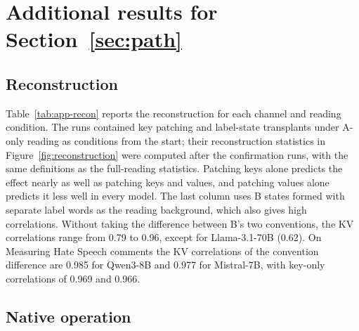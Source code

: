 \section{Additional results for Section~\ref{sec:path}}

\subsection{Reconstruction}
\label{app:reconstruction}

Table~\ref{tab:app-recon} reports the reconstruction for each channel and reading condition.
The runs contained key patching and label-state transplants under A-only reading as conditions from the start; their reconstruction statistics in Figure~\ref{fig:reconstruction} were computed after the confirmation runs, with the same definitions as the full-reading statistics.
Patching keys alone predicts the effect nearly as well as patching keys and values, and patching values alone predicts it less well in every model.
The last column uses B states formed with separate label words as the reading background, which also gives high correlations.
Without taking the difference between B's two conventions, the KV correlations range from 0.79 to 0.96, except for Llama-3.1-70B (0.62).
On Measuring Hate Speech comments the KV correlations of the convention difference are 0.985 for Qwen3-8B and 0.977 for Mistral-7B, with key-only correlations of 0.969 and 0.966.

\begin{table}[!ht]
\centering\small
\setlength{\tabcolsep}{2.4pt}
\caption{Correlation between predicted and actual effects of B's label words on A's label states (difference between B's conventions, SST-5). A-only K: key patching with A-only reading (Figure~\ref{fig:reconstruction}); the other columns read both sources.
RMSE: error of the KV prediction (nats); Zero: error of predicting no effect; Sep.: KV correlation with B's separate-word states as reading background.}
\label{tab:app-recon}
\end{table}

\subsection{Native operation}
\label{app:operation}

